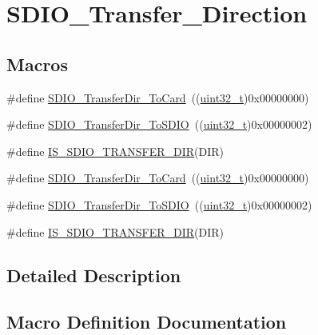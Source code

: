 \hypertarget{group___s_d_i_o___transfer___direction}{}\section{S\+D\+I\+O\+\_\+\+Transfer\+\_\+\+Direction}
\label{group___s_d_i_o___transfer___direction}
\subsection*{Macros}
\begin{DoxyCompactItemize}
\item 
\#define \hyperlink{group___s_d_i_o___transfer___direction_gaef8af0ffa4ea04b3362338d268cc0935}{S\+D\+I\+O\+\_\+\+Transfer\+Dir\+\_\+\+To\+Card}~((\hyperlink{_p_e___types_8h_a33594304e786b158f3fb30289278f5af}{uint32\+\_\+t})0x00000000)
\item 
\#define \hyperlink{group___s_d_i_o___transfer___direction_ga55a6d9613d3e2e7762296b45d0d13222}{S\+D\+I\+O\+\_\+\+Transfer\+Dir\+\_\+\+To\+S\+D\+IO}~((\hyperlink{_p_e___types_8h_a33594304e786b158f3fb30289278f5af}{uint32\+\_\+t})0x00000002)
\item 
\#define \hyperlink{group___s_d_i_o___transfer___direction_gaf84b8004cfef6a5a525b20db8a83c2f7}{I\+S\+\_\+\+S\+D\+I\+O\+\_\+\+T\+R\+A\+N\+S\+F\+E\+R\+\_\+\+D\+IR}(D\+IR)
\item 
\#define \hyperlink{group___s_d_i_o___transfer___direction_gaef8af0ffa4ea04b3362338d268cc0935}{S\+D\+I\+O\+\_\+\+Transfer\+Dir\+\_\+\+To\+Card}~((\hyperlink{_p_e___types_8h_a33594304e786b158f3fb30289278f5af}{uint32\+\_\+t})0x00000000)
\item 
\#define \hyperlink{group___s_d_i_o___transfer___direction_ga55a6d9613d3e2e7762296b45d0d13222}{S\+D\+I\+O\+\_\+\+Transfer\+Dir\+\_\+\+To\+S\+D\+IO}~((\hyperlink{_p_e___types_8h_a33594304e786b158f3fb30289278f5af}{uint32\+\_\+t})0x00000002)
\item 
\#define \hyperlink{group___s_d_i_o___transfer___direction_gaf84b8004cfef6a5a525b20db8a83c2f7}{I\+S\+\_\+\+S\+D\+I\+O\+\_\+\+T\+R\+A\+N\+S\+F\+E\+R\+\_\+\+D\+IR}(D\+IR)
\end{DoxyCompactItemize}


\subsection{Detailed Description}


\subsection{Macro Definition Documentation}
